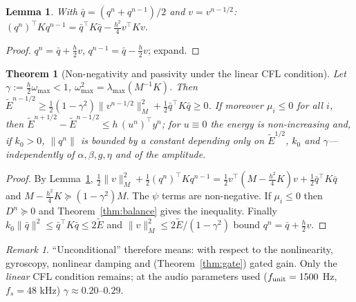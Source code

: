 \documentclass[11pt]{article}
\newtheorem{theorem}{Theorem}
\newtheorem{lemma}{Lemma}
\theoremstyle{remark}\newtheorem{remark}{Remark}
\begin{document}
\begin{lemma}\label{lem:split}
With $\bar q=(q^n+q^{n-1})/2$ and $v=v^{n-1/2}$: $(q^n)^\top Kq^{n-1}=\bar q^\top K\bar q-\tfrac{h^2}{4}v^\top Kv$.
\end{lemma}
\begin{proof}$q^n=\bar q+\tfrac h2v$, $q^{n-1}=\bar q-\tfrac h2v$; expand.\end{proof}

\begin{theorem}[Non-negativity and passivity under the linear CFL condition]\label{thm:passive}
Let $\gamma:=\tfrac h2\omega_{\max}<1$, $\omega_{\max}^2=\lambda_{\max}(M^{-1}K)$. Then
$\tilde E^{n-1/2}\ge\tfrac12(1-\gamma^2)\|v^{n-1/2}\|_M^2+\tfrac12\bar q^\top K\bar q\ge0$.
If moreover $\mu_i\le0$ for all $i$, then $\tilde E^{n+1/2}-\tilde E^{n-1/2}\le h\,(u^n)^\top y^n$; for $u\equiv0$ the energy is non-increasing
and, if $k_0>0$, $\|q^n\|$ is bounded by a constant depending only on $\tilde E^{1/2}$, $k_0$ and $\gamma$---independently of $\alpha,\beta,g,\eta$ and of the amplitude.
\end{theorem}
\begin{proof}
By Lemma~\ref{lem:split}, $\tfrac12\|v\|_M^2+\tfrac12(q^n)^\top Kq^{n-1}=\tfrac12v^\top(M-\tfrac{h^2}{4}K)v+\tfrac12\bar q^\top K\bar q$ and
$M-\tfrac{h^2}4K\succeq(1-\gamma^2)M$. The $\psi$ terms are non-negative. If $\mu_i\le0$ then $D^n\succeq0$ and Theorem~\ref{thm:balance} gives the inequality.
Finally $k_0\|\bar q\|^2\le\bar q^\top K\bar q\le2\tilde E$ and $\|v\|_M^2\le2\tilde E/(1-\gamma^2)$ bound $q^n=\bar q+\tfrac h2v$.
\end{proof}
\begin{remark}
``Unconditional'' therefore means: with respect to the nonlinearity, gyroscopy, nonlinear damping and (Theorem~\ref{thm:gate}) gated gain.
Only the \emph{linear} CFL condition remains; at the audio parameters used ($f_{\rm unit}=1500$ Hz, $f_s=48$ kHz) $\gamma\approx0.20$--$0.29$.
\end{remark}
\end{document}
